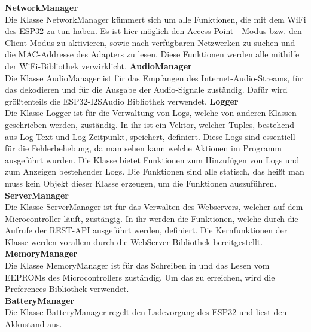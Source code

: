 \documentclass[]{article}
\begin{document}
\textbf{NetworkManager} \\
Die Klasse NetworkManager kümmert sich um alle Funktionen, die mit dem WiFi des ESP32 zu tun haben. Es ist hier möglich den Access Point - Modus bzw. den Client-Modus zu aktivieren, sowie nach verfügbaren Netzwerken zu suchen und die MAC-Addresse des Adapters zu lesen. Diese Funktionen werden alle mithilfe der WiFi-Bibliothek verwirklicht.
\vspace{4mm}\newline
\textbf{AudioManager} \\
Die Klasse AudioManager ist für das Empfangen des Internet-Audio-Streams, für das dekodieren und für die Ausgabe der Audio-Signale zuständig. Dafür wird größtenteils die ESP32-I2SAudio Bibliothek verwendet.
\vspace{4mm}\newline
\textbf{Logger} \\
Die Klasse Logger ist für die Verwaltung von Logs, welche von anderen Klassen geschrieben werden, zuständig. In ihr ist ein Vektor, welcher Tuples, bestehend aus Log-Text und Log-Zeitpunkt, speichert, definiert. Diese Logs sind essentiell für die Fehlerbehebung, da man sehen kann welche Aktionen im Programm ausgeführt wurden. Die Klasse bietet Funktionen zum Hinzufügen von Logs und zum Anzeigen bestehender Logs. Die Funktionen sind alle statisch, das heißt man muss kein Objekt dieser Klasse erzeugen, um die Funktionen auszuführen.
\vspace{4mm}\newline
\textbf{ServerManager} \\
Die Klasse ServerManager ist für das Verwalten des Webservers, welcher auf dem Microcontroller läuft, zustängig. In ihr werden die Funktionen, welche durch die Aufrufe der REST-API ausgeführt werden, definiert. Die Kernfunktionen der Klasse werden vorallem durch die WebServer-Bibliothek bereitgestellt.
\vspace{4mm}\newline
\textbf{MemoryManager} \\
Die Klasse MemoryManager ist für das Schreiben in und das Lesen vom EEPROMs des Microcontrollers zuständig. Um das zu erreichen, wird die Preferences-Bibliothek verwendet. \newline \\
\textbf{BatteryManager} \\
Die Klasse BatteryManager regelt den Ladevorgang des ESP32 und liest den Akkustand aus.
\end{document}
